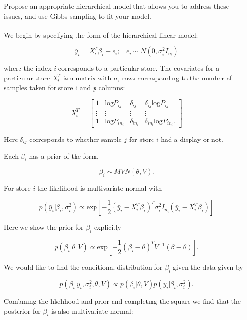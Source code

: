 \documentclass[12pt]{article}
\begin{document}
    Propose an appropriate hierarchical model that allows you to address these issues, and use Gibbs sampling to fit your model.\\
    \\

    We begin by specifying the form of the hierarchical linear model:

    $$\bar{y}_i = X_i^T \beta_i  + e_i; \hspace{10pt} e_i \sim N(0, \sigma_i^2 I_{n_i})$$

    \noindent where the index $i$ corresponds to a particular store. The covariates for a particular store $X_i^T$ is a matrix with $n_i$ rows corresponding to the number of samples taken for store $i$ and $p$ columns:

    $$X_i^T = \begin{bmatrix}1 & \text{log}P_{ij} & \delta_{ij} & \delta_{ij} \text{log}P_{ij} \\
    \vdots & \vdots & \vdots & \vdots \\
    1 & \text{log}P_{in_i} & \delta_{in_i} & \delta_{in_i} \text{log}P_{in_i}.
     \end{bmatrix}$$

    \noindent Here $\delta_{ij}$ corresponds to whether sample $j$ for store $i$ had a display or not. 

    Each $\beta_i$ has a prior of the form,

    $$\beta_i \sim MVN(\theta, V).$$

    \noindent For store $i$ the likelihood is multivariate normal with 

    $$p(\bar{y}_i | \beta_i, \sigma_i^2) \propto \text{exp}\left[-\frac{1}{2} (\bar{y}_i - X_i^T \beta_i)^T \sigma_i^2 I_{n_i} (\bar{y}_i - X_i^T \beta_i) \right]$$

    \noindent Here we show the prior for $\beta_i$ explicitly

    $$p(\beta_i | \theta, V) \propto \text{exp} \left[-\frac{1}{2} (\beta_i - \theta)^T V^{-1} (\beta - \theta) \right].$$

    \noindent We would like to find the conditional distribution for $\beta_i$ given the data given by

    $$p(\beta_i | \bar{y_i}, \sigma_i^2, \theta, V) \propto  p(\beta_i | \theta, V) p(\bar{y}_i | \beta_i, \sigma_i^2). $$

    \noindent Combining the likelihood and prior and completing the square we find that the posterior for $\beta_i$ is also multivariate normal:
\end{document}
